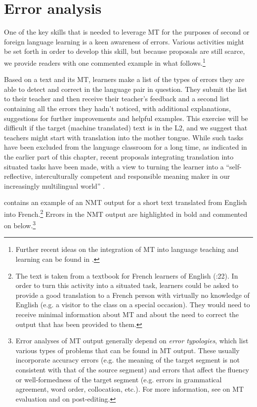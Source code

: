\documentclass[output=paper,colorlinks,citecolor=brown,
]{langscibook}
\begin{document}
\section{Error analysis}

One of the key skills that is needed to leverage MT for the purposes of second or foreign language learning is a keen awareness of errors. Various activities might be set forth in order to develop this skill, but because proposals are still scarce, we provide readers with one commented example in what follows.\footnote{Further recent ideas on the integration of MT into language teaching and learning can be found in \citet{VinallHellmich2022}.}

Based on a text and its MT, learners make a list of the types of errors they are able to detect and correct in the language pair in question. They submit the list to their teacher and then receive their teacher’s feedback and a second list containing all the errors they hadn’t noticed, with additional explanations, suggestions for further improvements and helpful examples. This exercise will be difficult if the target (machine translated) text is in the L2, and we suggest that teachers might start with translation into the mother tongue. While such tasks have been excluded from the language classroom for a long time, as indicated in the earlier part of this chapter, recent proposals integrating translation into situated tasks have been made, with a view to turning the learner into a “self-reflective, interculturally competent and responsible meaning maker in our increasingly multilingual world” \citep[105]{Laviosa2014}. 

 contains an example of an NMT output for a short text translated from English into French.\footnote{The text is taken from a textbook for French learners of English (\citealt{Joyeux2019}:22).  In order to turn this activity into a situated task, learners could be asked to provide a good translation to a French person with virtually no knowledge of English (e.g. a visitor to the class on a special occasion). They would need to receive minimal information about MT and about the need to correct the output that has been provided to them.}  Errors in the NMT output are highlighted in bold and commented on below.\footnote{Error analyses of MT output generally depend on \textit{error typologies}, which list various types of problems that can be found in MT output. These usually incorporate accuracy errors (e.g. the meaning of the target segment is not consistent with that of the source segment) and errors that affect the fluency or well-formedness of the target segment (e.g. errors in grammatical agreement, word order, collocation, etc.). For more information, see  on MT evaluation and  on post-editing.}
\end{document}
